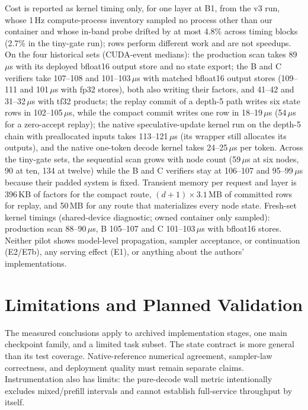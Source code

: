 \documentclass[conference]{IEEEtran}
\begin{document}
Cost is reported as kernel timing only, for one layer at B1, from the v3 run, whose 1\,Hz compute-process inventory sampled no process other than our container and whose in-band probe drifted by at most 4.8\% across timing blocks (2.7\% in the tiny-gate run); rows perform different work and are not speedups. On the four historical sets (CUDA-event medians): the production scan takes 89\,$\mu$s with its deployed bfloat16 output store and no state export; the B and C verifiers take 107--108 and 101--103\,$\mu$s with matched bfloat16 output stores (109--111 and 101\,$\mu$s with fp32 stores), both also writing their factors, and 41--42 and 31--32\,$\mu$s with tf32 products; the replay commit of a depth-5 path writes six state rows in 102--105\,$\mu$s, while the compact commit writes one row in 18--19\,$\mu$s (54\,$\mu$s for a zero-accept replay); the native speculative-update kernel run on the depth-5 chain with preallocated inputs takes 113--121\,$\mu$s (its wrapper still allocates its outputs), and the native one-token decode kernel takes 24--25\,$\mu$s per token. Across the tiny-gate sets, the sequential scan grows with node count (59\,$\mu$s at six nodes, 90 at ten, 134 at twelve) while the B and C verifiers stay at 106--107 and 95--99\,$\mu$s because their padded system is fixed. Transient memory per request and layer is 396\,KB of factors for the compact route, $(d{+}1)\times3.1$\,MB of committed rows for replay, and 50\,MB for any route that materializes every node state. Fresh-set kernel timings (shared-device diagnostic; owned container only sampled): production scan 88--90\,$\mu$s, B 105--107 and C 101--103\,$\mu$s with bfloat16 stores. Neither pilot shows model-level propagation, sampler acceptance, or continuation (E2/E7b), any serving effect (E1), or anything about the authors' implementations.

\section{Limitations and Planned Validation}
\label{sec:planned}
The measured conclusions apply to archived implementation stages, one main checkpoint family, and a limited task subset. The state contract is more general than its test coverage. Native-reference numerical agreement, sampler-law correctness, and deployment quality must remain separate claims. Instrumentation also has limits: the pure-decode wall metric intentionally excludes mixed/prefill intervals and cannot establish full-service throughput by itself.
\end{document}
